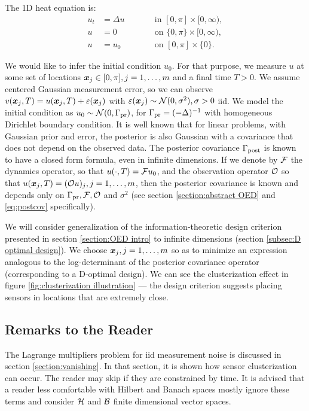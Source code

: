 \documentclass{amsart}
\numberwithin{equation}{section}
\begin{document}
The 1D heat equation is:
\begin{subequations}\label{eq:heat equation}
  \begin{alignat}{2}
    u_t &= \Delta u &&\qquad \text{in } [0,\pi] \times [0,\infty),\\
      u &= 0 &&\qquad \text{on } \{0, \pi\} \times [0,\infty),\\
        u &= u_0 &&\qquad \text{on }[0,\pi] \times \{0\}.
  \end{alignat}
\end{subequations}

We would like to infer the initial condition $u_0$. For that purpose,
we measure $u$ at some set of locations ${\boldsymbol{x}}_j \in [0,\pi], j=1, \dots,m$
and a final time $T > 0$. We assume centered Gaussian measurement
error, so we can observe $v({\boldsymbol{x}}_j,T) = u({\boldsymbol{x}}_j,T) + \varepsilon({\boldsymbol{x}}_j)$ with
$\varepsilon({\boldsymbol{x}}_j) \sim \mathcal{N}(0, \sigma^2), \sigma > 0$ iid. We model the
initial condition as $u_0 \sim \mathcal{N}(0,\Gamma_{\textup{pr}})$, for $\Gamma_{\textup{pr}} =
(-\Delta)^{-1}$ with homogeneous Dirichlet boundary condition. It is
well known \cite{Tarantola05} that for linear problems, with Gaussian
prior and error, the posterior is also Gaussian with a covariance that
does not depend on the observed data. The posterior covariance
$\Gamma_{\textup{post}}$ is known to have a closed form formula, even in infinite
dimensions\cite{Stuart10}. If we denote by $\mathcal{F}$ the dynamics
operator, so that $u( \cdot,T) = \mathcal{F} u_0$, and the observation
operator $\mathcal{O}$ so that $u({\boldsymbol{x}}_j,T) = (\mathcal{O} u)_j, j=1,\dots,m$, then the
posterior covariance is known and depends only on $\Gamma_{\textup{pr}}, \mathcal{F}, \mathcal{O}$ and
$\sigma^2$ (see section \ref{section:abstract OED} and
\eqref{eq:postcov} specifically).

We will consider generalization of the information-theoretic design
criterion presented in section \ref{section:OED intro} to infinite
dimensions (section \ref{subsec:D optimal design}). We choose
${\boldsymbol{x}}_j,j=1,\dots,m$ so as to minimize an expression analogous to the
log-determinant of the posterior covariance operator (corresponding to
a D-optimal design). We can see the clusterization effect in figure
\ref{fig:clusterization illustration} --- the design criterion
suggests placing sensors in locations that are extremely close.


\subsection{Remarks to the Reader}\label{subsec:plan}
The Lagrange multipliers problem for iid measurement noise is
discussed in section \ref{section:vanishing}. In that section, it is
shown how sensor clusterization can occur. The reader may skip if they
are constrained by time. It is advised that a reader less comfortable
with Hilbert and Banach spaces mostly ignore these terms and consider
$\mathcal{H}$ and $\mathcal{B}$ finite dimensional vector spaces.
\end{document}
